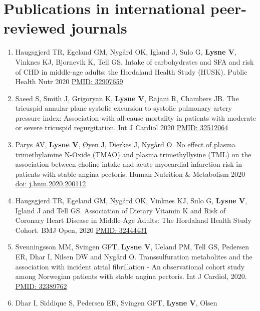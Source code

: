 \documentclass[11pt, a4paper]{awesome-cv}
\providecommand{\tightlist}{%
	\setlength{\itemsep}{0pt}\setlength{\parskip}{0pt}}
\begin{document}
\hypertarget{publications-in-international-peer-reviewed-journals}{%
\section{Publications in international peer-reviewed
journals}\label{publications-in-international-peer-reviewed-journals}}

\begin{enumerate}
\def\labelenumi{\arabic{enumi}.}
\tightlist
\item
  Haugsgjerd TR, Egeland GM, Nygård OK, Igland J, Sulo G, \textbf{Lysne
  V}, Vinknes KJ, Bjornevik K, Tell GS. Intake of carbohydrates and SFA
  and risk of CHD in middle-age adults: the Hordaland Health Study
  (HUSK). Public Health Nutr 2020
  \href{https://pubmed.ncbi.nlm.nih.gov/32907659/}{PMID: 32907659}
\item
  Saeed S, Smith J, Grigoryan K, \textbf{Lysne V}, Rajani R, Chambers
  JB. The tricuspid annular plane systolic excursion to systolic
  pulmonary artery pressure index: Association with all-cause mortality
  in patients with moderate or severe tricuspid regurgitation. Int J
  Cardiol 2020 \href{https://pubmed.ncbi.nlm.nih.gov/32512064/}{PMID:
  32512064}
\item
  Parys AV, \textbf{Lysne V}, Øyen J, Dierkes J, Nygård O. No effect of
  plasma trimethylamine N-Oxide (TMAO) and plasma trimethyllysine (TML)
  on the association between choline intake and acute myocardial
  infarction risk in patients with stable angina pectoris. Human
  Nutrition \& Metabolism 2020
  \href{https://www.sciencedirect.com/science/article/pii/S2666149720300025}{doi:
  j.hnm.2020.200112}
\item
  Haugsgjerd TR, Egeland GM, Nygård OK, Vinknes KJ, Sulo G,
  \textbf{Lysne V}, Igland J and Tell GS. Association of Dietary Vitamin
  K and Risk of Coronary Heart Disease in Middle-Age Adults: The
  Hordaland Health Study Cohort. BMJ Open, 2020
  \href{https://pubmed.ncbi.nlm.nih.gov/32444431}{PMID: 32444431}
\item
  Svenningsson MM, Svingen GFT, \textbf{Lysne V}, Ueland PM, Tell GS,
  Pedersen ER, Dhar I, Nilsen DW and Nygård O. Transsulfuration
  metabolites and the association with incident atrial fibrillation - An
  observational cohort study among Norwegian patients with stable angina
  pectoris. Int J Cardiol, 2020.
  \href{https://www.ncbi.nlm.nih.gov/pubmed/32389762}{PMID: 32389762}
\item
  Dhar I, Siddique S, Pedersen ER, Svingen GFT, \textbf{Lysne V}, Olsen

\end{enumerate}
\end{document}
